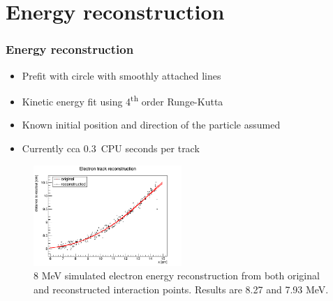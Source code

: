 \documentclass{beamer}
\begin{document}
	\section{Energy reconstruction}
	\begin{frame}
		\frametitle{Energy reconstruction}
		\begin{itemize}
			\item Prefit with circle with smoothly attached lines
			\item Kinetic energy fit using 4\textsuperscript{th} order Runge-Kutta
			\item Known initial position and direction of the particle assumed
			\item Currently cca 0.3~CPU seconds per track
		\end{itemize}
		\begin{figure}
			\centering
			\includegraphics[width=0.5\textwidth]{../images/reco_e.png}\\
			\small{8 MeV simulated electron energy reconstruction from both original and reconstructed interaction points. Results are 8.27 and 7.93 MeV.}
		\end{figure}		
	\end{frame}
\end{document}

